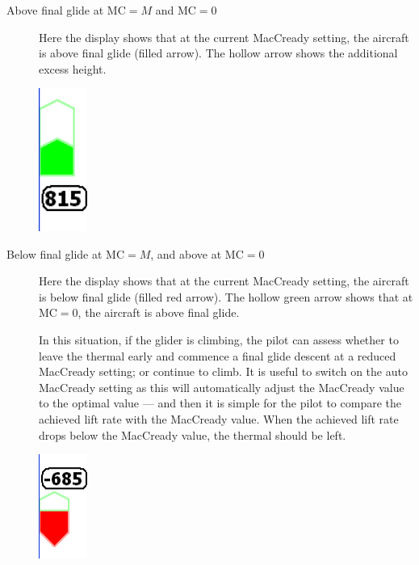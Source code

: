 \begin{description}

\item[Above final glide at MC$=M$ and MC$=0$]
  Here the display shows that at the current MacCready setting, the aircraft
  is above final glide (filled arrow).  The hollow arrow shows the additional
  excess height.

\begin{center}
\includegraphics[angle=0,width=1.6cm,keepaspectratio='true']{figures/fig-finalglide-allabove.png}
\end{center}

\item[Below final glide at MC$=M$, and above at MC$=0$]
  Here the display shows that at the current MacCready setting, the aircraft
  is below final glide (filled red arrow).  The hollow green arrow
  shows that at MC$=0$, the aircraft is above final glide.

  In this situation, if the glider is climbing, the pilot can assess
  whether to leave the thermal early and commence a final glide
  descent at a reduced MacCready setting; or continue to climb.  It is
  useful to switch on the auto MacCready setting as this will
  automatically adjust the MacCready value to the optimal value ---
  and then it is simple for the pilot to compare the achieved lift
  rate with the MacCready value.  When the achieved lift rate drops
  below the MacCready value, the thermal should be left.

\begin{center}
\includegraphics[angle=0,width=1.6cm,keepaspectratio='true']{figures/fig-finalglide-halfabove.png}
\end{center}


\end{description}
